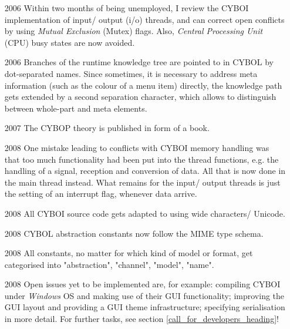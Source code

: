 \begin{itemize}
    \item[2006] Within two months of being unemployed, I review the CYBOI
        implementation of input/ output (i/o) threads, and can correct open
        conflicts by using \emph{Mutual Exclusion} (Mutex) flags.
        Also, \emph{Central Processing Unit} (CPU) busy states are now avoided.
    \item[2006] Branches of the runtime knowledge tree are pointed to in CYBOL
        by dot-separated names. Since sometimes, it is necessary to address meta
        information (such as the colour of a menu item) directly, the knowledge
        path gets extended by a second separation character, which allows to
        distinguish between whole-part and meta elements.
    \item[2007] The CYBOP theory is published in form of a book.
    \item[2008] One mistake leading to conflicts with CYBOI memory handling was
        that too much functionality had been put into the thread functions,
        e.g. the handling of a signal, reception and conversion of data.
        All that is now done in the main thread instead. What remains for the
        input/ output threads is just the setting of an interrupt flag,
        whenever data arrive.
    \item[2008] All CYBOI source code gets adapted to using wide characters/ Unicode.
    \item[2008] CYBOL abstraction constants now follow the MIME type schema.
    \item[2008] All constants, no matter for which kind of model or format,
        get categorised into "abstraction", "channel", "model", "name".
    \item[2008] Open issues yet to be implemented are, for example:
        compiling CYBOI under \emph{Windows} OS and making use of their GUI
        functionality; improving the GUI layout and providing a GUI theme
        infrastructure; specifying serialisation in more detail.
        For further tasks, see section \ref{call_for_developers_heading}!
\end{itemize}
